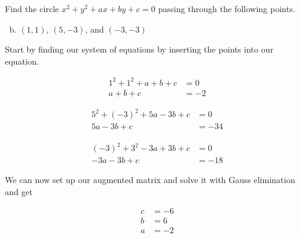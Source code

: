 \documentclass[../main.tex]{subfiles}
\begin{document}
Find the circle $x^2 + y^2 + ax + by + c = 0$ passing through the following points.

\begin{enumerate}[a)]
	\setcounter{enumi}{1}
	\item $(1, 1)$, $(5, -3)$, and $(-3, -3)$
\end{enumerate}

\solution

Start by finding our system of equations by inserting the points into our equation.

\begin{align*}
    1^2+1^2+a+b+c &= 0\\
    a+b+c &= -2
\end{align*}

\begin{align*}
    5^2 + (-3)^2 + 5a - 3b + c &= 0\\
    5a - 3b + c &= -34
\end{align*}

\begin{align*}
    (-3)^2 + 3^2 - 3a + 3b + c &= 0\\
    -3a - 3b + c &= -18
\end{align*}

We can now set up our augmented matrix and solve it with Gauss elimination and get

\begin{align*}
    c &= -6\\
    b &= 6\\
    a &= -2 
\end{align*}
\end{document}
